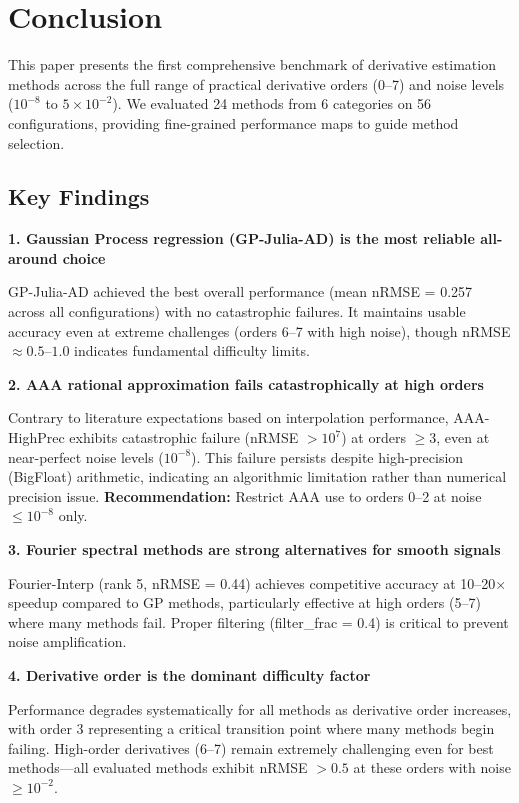 \section{Conclusion}
\label{sec:conclusion}

This paper presents the first comprehensive benchmark of derivative estimation methods across the full range of practical derivative orders (0--7) and noise levels ($10^{-8}$ to $5 \times 10^{-2}$). We evaluated 24 methods from 6 categories on 56 configurations, providing fine-grained performance maps to guide method selection.

\subsection{Key Findings}

\textbf{1. Gaussian Process regression (GP-Julia-AD) is the most reliable all-around choice}

GP-Julia-AD achieved the best overall performance (mean nRMSE = 0.257 across all configurations) with no catastrophic failures. It maintains usable accuracy even at extreme challenges (orders 6--7 with high noise), though nRMSE $\approx 0.5$--$1.0$ indicates fundamental difficulty limits.

\textbf{2. AAA rational approximation fails catastrophically at high orders}

Contrary to literature expectations based on interpolation performance, AAA-HighPrec exhibits catastrophic failure (nRMSE $> 10^7$) at orders $\geq 3$, even at near-perfect noise levels ($10^{-8}$). This failure persists despite high-precision (BigFloat) arithmetic, indicating an algorithmic limitation rather than numerical precision issue. \textbf{Recommendation:} Restrict AAA use to orders 0--2 at noise $\leq 10^{-8}$ only.

\textbf{3. Fourier spectral methods are strong alternatives for smooth signals}

Fourier-Interp (rank 5, nRMSE = 0.44) achieves competitive accuracy at 10--20$\times$ speedup compared to GP methods, particularly effective at high orders (5--7) where many methods fail. Proper filtering (filter\_frac = 0.4) is critical to prevent noise amplification.

\textbf{4. Derivative order is the dominant difficulty factor}

Performance degrades systematically for all methods as derivative order increases, with order 3 representing a critical transition point where many methods begin failing. High-order derivatives (6--7) remain extremely challenging even for best methods—all evaluated methods exhibit nRMSE $> 0.5$ at these orders with noise $\geq 10^{-2}$.

